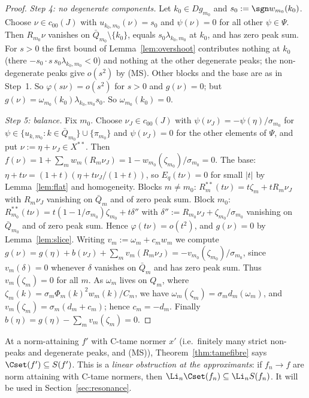 \begin{proof}
\emph{Step 4: no degenerate components.}  Let $k_0\in Dg_{m_0}$ and
$s_0:=\sgn w_{m_0}(k_0)$.  Choose $\nu\in c_{00}(J)$ with
$u_{k_0,m_0}(\nu)=s_0$ and $\psi(\nu)=0$ for all other $\psi\in\Psi$.  Then
$R_{m_0}\nu$ vanishes on $\bar Q_{m_0}\setminus\{k_0\}$, equals
$s_0\lambda_{k_0,m_0}$ at $k_0$, and has zero peak sum.  For $s>0$ the
first bound of Lemma~\ref{lem:overshoot} contributes nothing at $k_0$
(there $-s_0\cdot s\,s_0\lambda_{k_0,m_0}<0$) and nothing at the other
degenerate peaks; the non-degenerate peaks give $o(s^2)$ by (MS).  Other
blocks and the base are as in Step~1.  So $\varphi(s\nu)=o(s^2)$ for
$s>0$ and $g(\nu)=0$; but
$g(\nu)=\omega_{m_0}(k_0)\lambda_{k_0,m_0}s_0$.  So $\omega_{m_0}(k_0)=0$.

\emph{Step 5: balance.}  Fix $m_0$.  Choose $\nu_J\in c_{00}(J)$ with
$\psi(\nu_J)=-\psi(\eta)/\sigma_{m_0}$ for $\psi\in\{u_{k,m_0}:k\in\bar
Q_{m_0}\}\cup\{\pi_{m_0}\}$ and $\psi(\nu_J)=0$ for the other elements of
$\Psi$, and put $\nu:=\eta+\nu_J\in X^{**}$.  Then
$f(\nu)=1+\sum_mw_m(R_m\nu_J)=1-w_{m_0}(\zeta_{m_0})/\sigma_{m_0}=0$.  The
base: $\eta+t\nu=(1+t)(\eta+t\nu_J/(1+t))$, so $E_q(t\nu)=0$ for small
$|t|$ by Lemma~\ref{lem:flat} and homogeneity.  Blocks $m\ne m_0$:
$R_m^{**}(t\nu)=t\zeta_m+tR_m\nu_J$ with $R_m\nu_J$ vanishing on $\bar Q_m$
and of zero peak sum.  Block $m_0$: $R^{**}_{m_0}(t\nu)=t(1-1/\sigma_{m_0})
\zeta_{m_0}+t\delta''$ with $\delta'':=R_{m_0}\nu_J+\zeta_{m_0}/\sigma_{m_0}$
vanishing on $\bar Q_{m_0}$ and of zero peak sum.  Hence $\varphi(t\nu)=
o(t^2)$, and $g(\nu)=0$ by Lemma~\ref{lem:slice}.  Writing
$v_m:=\omega_m+c_mw_m$ we compute $g(\nu)=g(\eta)+b(\nu_J)+\sum_m
v_m(R_m\nu_J)=-v_{m_0}(\zeta_{m_0})/\sigma_{m_0}$, since $v_m(\delta)=0$
whenever $\delta$ vanishes on $\bar Q_m$ and has zero peak sum.  Thus
$v_m(\zeta_m)=0$ for all $m$.  As $\omega_m$ lives on $Q_m$, where
$\zeta_m(k)=\sigma_m\Phi_m(k)^2w_m(k)/C_m$, we have
$\omega_m(\zeta_m)=\sigma_md_m(\omega_m)$, and $v_m(\zeta_m)=\sigma_m(d_m+
c_m)$; hence $c_m=-d_m$.  Finally $b(\eta)=g(\eta)-\sum_mv_m(\zeta_m)=0$.
\end{proof}

\begin{remark}\label{rem:tameNA}
At a norm-attaining $f'$ with C-tame normer $x'$ (i.e.\ finitely many
strict non-peaks and degenerate peaks, and (MS)), Theorem~\ref{thm:tamefibre}
says $\Cset(f')\subseteq S(f')$.  This is a \emph{linear obstruction at the
approximants}: if $f_n\to f$ are norm attaining with C-tame normers, then
$\Li_n\Cset(f_n)\subseteq\Li_nS(f_n)$.  It will be used in
Section~\ref{sec:resonance}.
\end{remark}

